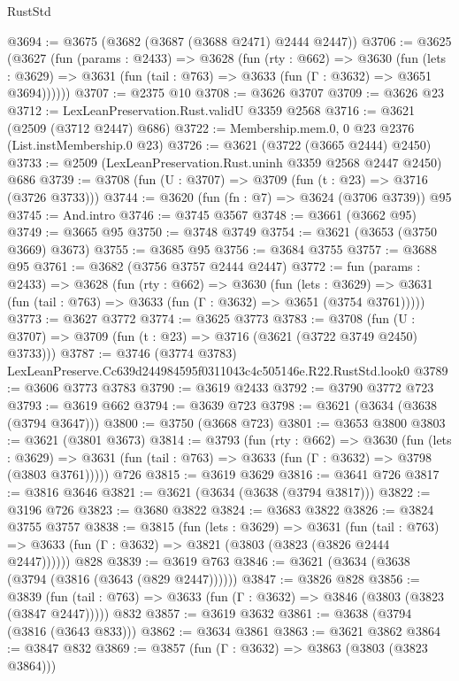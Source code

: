 \begin{lexlean}{RustStd}
\begin{coremodule}
@3694 := @3675 (@3682 (@3687 (@3688 @2471) @2444 @2447))
@3706 := @3625
    (@3627
      (fun (params : @2433) =>
      @3628
        (fun (rty : @662) =>
        @3630
          (fun (lets : @3629) =>
          @3631 (fun (tail : @763) => @3633 (fun (Γ : @3632) => @3651 @3694))))))
@3707 := @2375 @10
@3708 := @3626 @3707
@3709 := @3626 @23
@3712 := LexLeanPreservation.Rust.validU @3359 @2568
@3716 := @3621 (@2509 (@3712 @2447) @686)
@3722 := Membership.mem.{0, 0} @23 @2376 (List.instMembership.{0} @23)
@3726 := @3621 (@3722 (@3665 @2444) @2450)
@3733 := @2509 (LexLeanPreservation.Rust.uninh @3359 @2568 @2447 @2450) @686
@3739 := @3708 (fun (U : @3707) => @3709 (fun (t : @23) => @3716 (@3726 @3733)))
@3744 := @3620 (fun (fn : @7) => @3624 (@3706 @3739)) @95
@3745 := And.intro
@3746 := @3745 @3567
@3748 := @3661 (@3662 @95)
@3749 := @3665 @95
@3750 := @3748 @3749
@3754 := @3621 (@3653 (@3750 @3669) @3673)
@3755 := @3685 @95
@3756 := @3684 @3755
@3757 := @3688 @95
@3761 := @3682 (@3756 @3757 @2444 @2447)
@3772 := fun (params : @2433) =>
  @3628
    (fun (rty : @662) =>
    @3630
      (fun (lets : @3629) =>
      @3631 (fun (tail : @763) => @3633 (fun (Γ : @3632) => @3651 (@3754 @3761)))))
@3773 := @3627 @3772
@3774 := @3625 @3773
@3783 := @3708 (fun (U : @3707) => @3709 (fun (t : @23) => @3716 (@3621 (@3722 @3749 @2450) @3733)))
@3787 := @3746 (@3774 @3783) LexLeanPreserve.Cc639d244984595f0311043c4c505146e.R22.RustStd.look0
@3789 := @3606 @3773 @3783
@3790 := @3619 @2433
@3792 := @3790 @3772 @723
@3793 := @3619 @662
@3794 := @3639 @723
@3798 := @3621 (@3634 (@3638 (@3794 @3647)))
@3800 := @3750 (@3668 @723)
@3801 := @3653 @3800
@3803 := @3621 (@3801 @3673)
@3814 := @3793
    (fun (rty : @662) =>
    @3630
      (fun (lets : @3629) =>
      @3631 (fun (tail : @763) => @3633 (fun (Γ : @3632) => @3798 (@3803 @3761)))))
    @726
@3815 := @3619 @3629
@3816 := @3641 @726
@3817 := @3816 @3646
@3821 := @3621 (@3634 (@3638 (@3794 @3817)))
@3822 := @3196 @726
@3823 := @3680 @3822
@3824 := @3683 @3822
@3826 := @3824 @3755 @3757
@3838 := @3815
    (fun (lets : @3629) =>
    @3631
      (fun (tail : @763) => @3633 (fun (Γ : @3632) => @3821 (@3803 (@3823 (@3826 @2444 @2447))))))
    @828
@3839 := @3619 @763
@3846 := @3621 (@3634 (@3638 (@3794 (@3816 (@3643 (@829 @2447))))))
@3847 := @3826 @828
@3856 := @3839
    (fun (tail : @763) => @3633 (fun (Γ : @3632) => @3846 (@3803 (@3823 (@3847 @2447)))))
    @832
@3857 := @3619 @3632
@3861 := @3638 (@3794 (@3816 (@3643 @833)))
@3862 := @3634 @3861
@3863 := @3621 @3862
@3864 := @3847 @832
@3869 := @3857 (fun (Γ : @3632) => @3863 (@3803 (@3823 @3864)))

\end{coremodule}
\end{lexlean}
